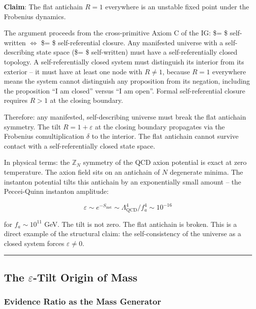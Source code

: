 \textbf{Claim}: The flat antichain \(R = 1\) everywhere is an unstable
fixed point under the Frobenius dynamics.

The argument proceeds from the cross-primitive Axiom C of the IG:
\$\eth = \$ self-written \(\iff\) \$\Theta = \$ self-referential
closure. Any manifested universe with a self-describing state space
(\$\eth = \$ self-written) must have a self-referentially closed
topology. A self-referentially closed system must distinguish its
interior from its exterior -- it must have at least one node with
\(R \ne 1\), because \(R = 1\) everywhere means the system cannot
distinguish any proposition from its negation, including the proposition
``I am closed'' versus ``I am open''. Formal self-referential closure
requires \(R > 1\) at the closing boundary.

Therefore: any manifested, self-describing universe must break the flat
antichain symmetry. The tilt \(R = 1 + \varepsilon\) at the closing
boundary propagates via the Frobenius comultiplication \(\delta\) to the
interior. The flat antichain cannot survive contact with a
self-referentially closed state space.

In physical terms: the \(\mathbb{Z}_N\) symmetry of the QCD axion
potential is exact at zero temperature. The axion field sits on an
antichain of \(N\) degenerate minima. The instanton potential tilts this
antichain by an exponentially small amount -- the Peccei-Quinn instanton
amplitude:

\[\varepsilon \sim e^{-S_\text{inst}} \sim \Lambda_\text{QCD}^4 / f_a^4 \sim 10^{-16}\]

for \(f_a \sim 10^{11}\) GeV. The tilt is not zero. The flat antichain
is broken. This is a direct example of the structural claim: the
self-consistency of the universe as a closed system forces
\(\varepsilon \ne 0\).

\begin{center}\rule{0.5\linewidth}{0.5pt}\end{center}

\hypertarget{the-varepsilon-tilt-origin-of-mass}{%
\subsection{\texorpdfstring{The \(\varepsilon\)-Tilt Origin of
Mass}{The \textbackslash varepsilon-Tilt Origin of Mass}}\label{the-varepsilon-tilt-origin-of-mass}}

\hypertarget{evidence-ratio-as-the-mass-generator}{%
\subsubsection{Evidence Ratio as the Mass
Generator}\label{evidence-ratio-as-the-mass-generator}}

